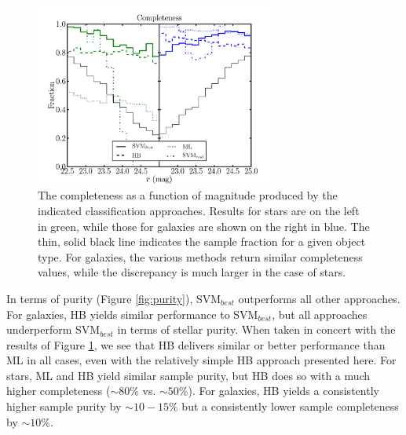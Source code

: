 \documentclass[12pt,preprint]{aastex}
\begin{document}
\begin{figure}
\centering
 \includegraphics[clip=true, trim=0cm 0cm 0.0cm 0.cm,width=8cm]{fig3.pdf}
\caption{The completeness as a function of magnitude produced by the
  indicated classification approaches.  Results for stars are on the
  left in green, while those for galaxies are shown on the right in
  blue.  The thin, solid black line indicates the sample fraction for
  a given object type.  For galaxies, the various methods return
  similar completeness values, while the discrepancy is much larger in
  the case of stars.}
\label{fig:completeness}
\end{figure}


In terms of purity (Figure \ref{fig:purity}), SVM$_{best}$ outperforms
all other approaches.  For galaxies, HB yields similar performance to
SVM$_{best}$, but all approaches underperform SVM$_{best}$ in terms of
stellar purity.  When taken in concert with the results of Figure
\ref{fig:completeness}, we see that HB delivers similar or better
performance than ML in all cases, even with the relatively simple HB
approach presented here.  For stars, ML and HB yield similar sample
purity, but HB does so with a much higher completeness ($\sim 80\%$
vs. $\sim 50\%$).  For galaxies, HB yields a consistently higher
sample purity by $\sim 10-15\%$ but a consistently lower sample
completeness by $\sim10\%$.
\end{document}
